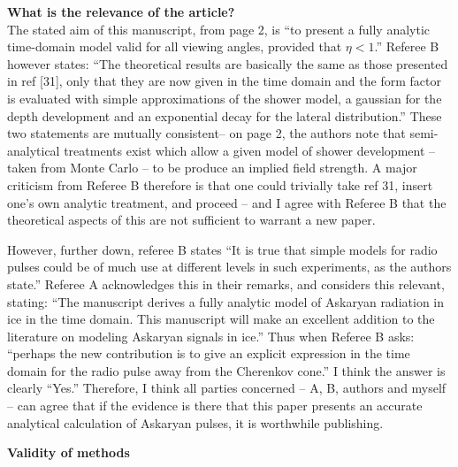 \documentclass[12pt]{article}
\begin{document}
\textbf{What is the relevance of the article?} \\

The stated aim of this manuscript, from page 2, is ``to present a fully analytic time-domain model valid for all viewing angles, provided that $\eta < 1$.''  Referee B however states: ``The theoretical results are basically the same as those presented in ref [31], only that they are now given in the time domain and the form factor is evaluated with simple approximations of the shower model, a gaussian for the depth development and an exponential decay for the lateral distribution.''  These two statements are mutually consistent– on page 2, the authors note that semi-analytical treatments exist which allow a given model of shower development – taken from Monte Carlo – to be produce an implied field strength.  A major criticism from Referee B therefore is that one could trivially take ref 31, insert one's own analytic treatment, and proceed – and I agree with Referee B that the theoretical aspects of this are not sufficient to warrant a new paper.

However, further down, referee B states ``It is true that simple models for radio pulses could be of much use at different levels in such experiments, as the authors state.''  Referee A acknowledges this in their remarks, and considers this relevant, stating: ``The manuscript derives a fully analytic model of Askaryan radiation in ice in the time domain. This manuscript will make an excellent addition to the literature on modeling Askaryan signals in ice.'' Thus when Referee B asks: ``perhaps the new contribution is to give an explicit expression in the time domain for the radio pulse away from the Cherenkov cone.''  I think the answer is clearly ``Yes.'' Therefore, I think all parties concerned – A, B, authors and myself – can agree that if the evidence is there that this paper presents an accurate analytical calculation of Askaryan pulses, it is worthwhile publishing.

\clearpage

\textbf{Validity of methods} \\
\end{document}
